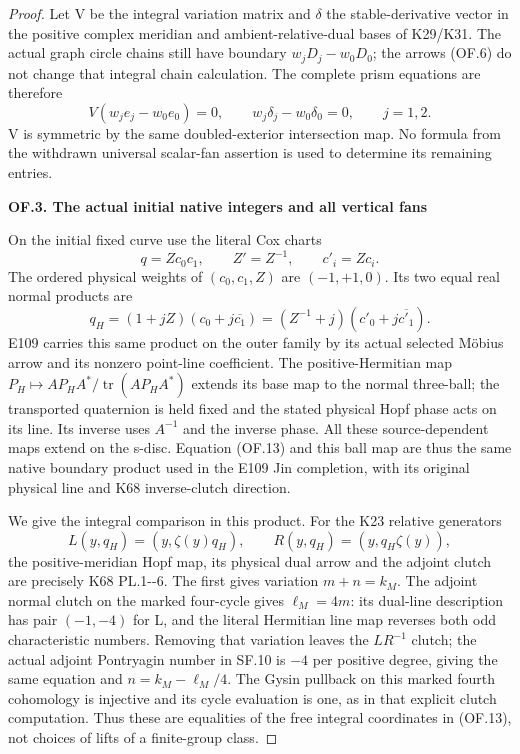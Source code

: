 \begin{proof}
Let V be the integral variation matrix and \(\delta\) the
stable-derivative vector in the positive complex meridian and
ambient-relative-dual bases of K29/K31. The actual graph
circle chains still have boundary
\(w_jD_j-w_0D_0\); the arrows (OF.6) do not change that
integral chain calculation. The complete prism equations are
therefore
\[
 V(w_je_j-w_0e_0)=0,\qquad
 w_j\delta_j-w_0\delta_0=0,\qquad j=1,2.             \tag{OF.12}
\]
V is symmetric by the same doubled-exterior intersection map.
No formula from the withdrawn universal scalar-fan assertion
is used to determine its remaining entries.

\par

\medskip\noindent\textbf{OF.3. The actual initial native integers and all vertical fans}

\par\nobreak

On the initial fixed curve use the literal Cox charts
\[
 q=Zc_0c_1,\qquad Z'=Z^{-1},\qquad c'_i=Zc_i.
\]
The ordered physical weights of \((c_0,c_1,Z)\) are
\((-1,+1,0)\). Its two equal real normal products are
\[
 q_H=(1+jZ)(c_0+j\overline{c_1})
     =(Z^{-1}+j)(c'_0+j\overline{c'_1}).             \tag{OF.13}
\]
E109 carries this same product on the outer family by its
actual selected Möbius arrow and its nonzero point-line
coefficient. The positive-Hermitian map
\(P_H\mapsto AP_HA^*/\operatorname{tr}(AP_HA^*)\)
extends its base map to the normal three-ball; the transported
quaternion is held fixed and the stated physical Hopf phase
acts on its line. Its inverse uses \(A^{-1}\) and the inverse
phase. All these source-dependent maps extend on the s-disc.
Equation (OF.13) and this ball map are thus the same native
boundary product used in the E109 Jin completion, with its
original physical line and K68 inverse-clutch direction.

We give the integral comparison in this product. For the K23
relative generators
\[
 L(y,q_H)=(y,\zeta(y)q_H),\qquad
 R(y,q_H)=(y,q_H\zeta(y)),
\]
the positive-meridian Hopf map, its physical dual arrow and
the adjoint clutch are precisely K68 PL.1-\/-6. The first gives
variation \(m+n=k_M\). The adjoint normal clutch on the
marked four-cycle gives \(\ell_M=4m\): its dual-line
description has pair \((-1,-4)\) for L, and the literal
Hermitian line map reverses both odd characteristic numbers.
Removing that variation leaves the \(LR^{-1}\) clutch;
the actual adjoint Pontryagin number in SF.10 is \(-4\)
per positive degree, giving the same equation and
\(n=k_M-\ell_M/4\). The Gysin pullback on this marked
fourth cohomology is injective and its cycle evaluation is
one, as in that explicit clutch computation. Thus these
are equalities of the free integral coordinates in (OF.13),
not choices of lifts of a finite-group class.


\end{proof}
